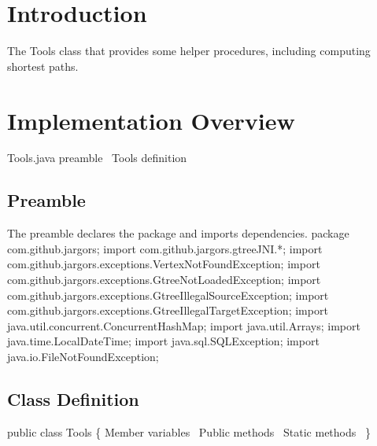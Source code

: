 \section{Introduction}
\label{sec:introduction}
The Tools class that provides some helper procedures, including computing
shortest paths.

\section{Implementation Overview}
\endmoddef{}
\LA{}Tools.java preamble~{\nwtagstyle{}}\RA{}
\LA{}\code{}Tools\edoc{} definition~{\nwtagstyle{}}\RA{}
\nwendcode{}\nwdocspar

\subsection{Preamble}
The preamble declares the package and imports dependencies.
\nwenddocs{}\endmoddef{}
package com.github.jargors;
import com.github.jargors.gtreeJNI.*;
import com.github.jargors.exceptions.VertexNotFoundException;
import com.github.jargors.exceptions.GtreeNotLoadedException;
import com.github.jargors.exceptions.GtreeIllegalSourceException;
import com.github.jargors.exceptions.GtreeIllegalTargetException;
import java.util.concurrent.ConcurrentHashMap;
import java.util.Arrays;
import java.time.LocalDateTime;
import java.sql.SQLException;
import java.io.FileNotFoundException;
\nwendcode{}\nwdocspar

\subsection{Class Definition}
\nwenddocs{}\endmoddef{}
public class Tools \{
  \LA{}Member variables~{\nwtagstyle{}}\RA{}
  \LA{}Public methods~{\nwtagstyle{}}\RA{}
  \LA{}Static methods~{\nwtagstyle{}}\RA{}
\}
\nwendcode{}\nwdocspar

